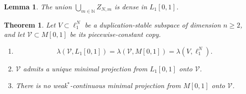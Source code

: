 \documentclass[10pt,a4paper]{amsart}
\newtheorem{lemma}{Lemma}
\newtheorem{theorem}{Theorem}
\newcommand{\N}{\mathbb N}
\begin{document}
\begin{lemma}
\label{lem:ZNm-dense}
The union $\bigcup_{m\in\N} Z_{N,m}$ is dense in $L_1[0,1]$.
\end{lemma}

\begin{theorem}
\label{thm:piecewise-main}
Let $V\subset \ell_1^N$ be a duplication-stable subspace of dimension $n\geqslant 2$, and let $\mathscr V\subset M[0,1]$ be its piecewise-constant copy.

\begin{enumerate}[label=\textup{(\roman*)}]
\item
\[
\lambda(\mathscr V,L_1[0,1]) = \lambda(\mathscr V,M[0,1]) = \lambda(V,\ell_1^N).
\]
\item $\mathscr V$ admits a unique minimal projection from $L_1[0,1]$ onto $\mathscr V$.
\item There is no weak$^*$-continuous minimal projection from $M[0,1]$ onto $\mathscr V$.
\end{enumerate}
\end{theorem}
\end{document}
